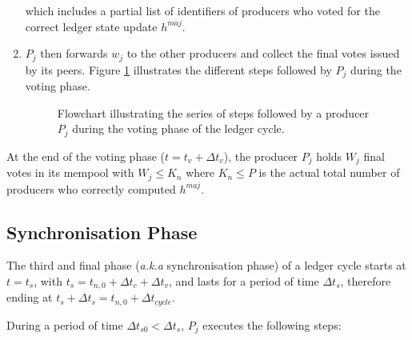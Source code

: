 \begin{enumerate}
which includes a partial list of identifiers of producers who voted for the correct ledger state update $h^{maj}$. 

\item $P_j$ then forwards $w_j$  to the other producers and collect the final votes issued by its peers. Figure \ref{fig:Vot} illustrates the different steps followed by $P_j$ during the voting phase.
\begin{figure}[H]
\label{fig:Vot}
\caption{\label{fig:Vot}Flowchart illustrating the series of steps followed by a producer $P_j$ during the voting phase of the ledger cycle.}
\end{figure}
\end{enumerate}

At the end of the voting phase ($t = t_v+\Delta t_{v}$), the producer $P_j$ holds $W_j$ final votes in its mempool with $W_j \leq K_n$ where $K_n \leq P$ is the actual total number of producers who correctly computed $h^{maj}$.  


\subsection{Synchronisation Phase}


The third and final phase (\textit{a.k.a} synchronisation phase) of a ledger cycle starts at $t = t_s$, with $t_s = t_{n,0} + \Delta t_{c} + \Delta t_{v}$, and lasts for a period of time $\Delta t_{s}$, therefore ending at $t_s+\Delta t_s = t_{n,0}  + \Delta t_{cycle}$.

During a period of time $\Delta t_{s0} < \Delta t_{s}$, $P_j$ executes the following steps:

